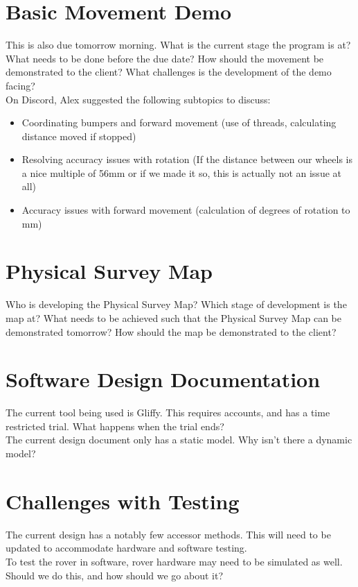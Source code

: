 \documentclass[11pt, a4paper]{article}
\begin{document}
\begin{flushleft}
  \section{Basic Movement Demo}
  This is also due tomorrow morning. What is the current stage the program is at? What needs to be done before the due date? How should the movement be demonstrated to the client? What challenges is the development of the demo facing? \\
  On Discord, Alex suggested the following subtopics to discuss:
  \begin{itemize}
  \item Coordinating bumpers and forward movement (use of threads, calculating distance moved if stopped)
  \item Resolving accuracy issues with rotation (If the distance between our wheels is a nice multiple of 56mm or if we made it so, this is actually not an issue at all)
  \item Accuracy issues with forward movement (calculation of degrees of rotation to mm)
  \end{itemize}
	
  \section{Physical Survey Map}
  Who is developing the Physical Survey Map? Which stage of development is the map at? What needs to be achieved such that the Physical Survey Map can be demonstrated tomorrow? How should the map be demonstrated to the client?
	
  \section{Software Design Documentation}	
  The current tool being used is Gliffy. This requires accounts, and has a time restricted trial. What happens when the trial ends?\\
  The current design document only has a static model. Why isn't there a dynamic model?

  \section{Challenges with Testing}
  The current design has a notably few accessor methods. This will need to be updated to accommodate hardware and software testing.\\ To test the rover in software, rover hardware may need to be simulated as well. Should we do this, and how should we go about it?
  

\end{flushleft}
\end{document}
